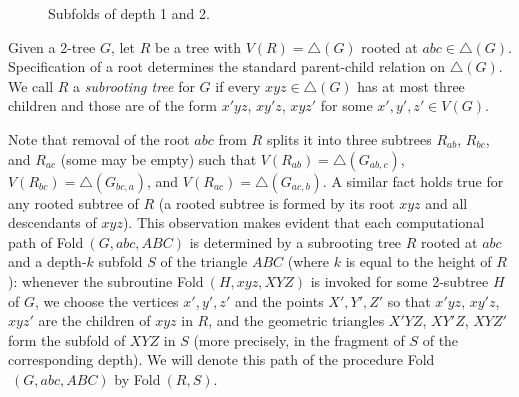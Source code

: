 \documentclass[reqno,12pt]{amsart}
\newcommand{\fold}[2]{{\sc Fold}$^{#1}\,(#2)$}
\begin{document}
\begin{figure}
\centering
\qquad\qquad
\caption{Subfolds of depth 1 and 2.}
\label{fig:subfolds}
\end{figure}

Given a 2-tree $G$, let $R$ be a tree with $V(R)=\triangle(G)$ rooted at $abc\in\triangle(G)$.
Specification of a root determines the standard parent-child relation on $\triangle(G)$.
We call $R$ a \emph{subrooting tree} for $G$ if every $xyz\in\triangle(G)$ has at most
three children and those are of the form $x'yz$, $xy'z$, $xyz'$ for some $x',y',z'\in V(G)$.

Note that removal of the root $abc$ from $R$ splits it into three subtrees
$R_{ab}$, $R_{bc}$, and $R_{ac}$ (some may be empty) such that $V(R_{ab})=\triangle(G_{ab,c})$, 
$V(R_{bc})=\triangle(G_{bc,a})$, and $V(R_{ac})=\triangle(G_{ac,b})$.
A similar fact holds true for any rooted subtree of $R$
(a rooted subtree is formed by its root $xyz$ and all descendants of $xyz$).
This observation makes evident that each computational path of \fold{}{G,abc,ABC}
is determined by a subrooting tree $R$ rooted at $abc$ and a depth-$k$ subfold $S$
of the triangle $ABC$ (where $k$ is equal to the height of $R$):
whenever the subroutine \fold{}{H,xyz,XYZ} is invoked for some 2-subtree $H$ of $G$,
we choose the vertices $x',y',z'$ and the points $X',Y',Z'$ so that
$x'yz$, $xy'z$, $xyz'$ are the children of $xyz$ in $R$, and
the geometric triangles $X'YZ$, $XY'Z$, $XYZ'$ form the subfold of $XYZ$ in $S$
(more precisely, in the fragment of $S$ of the corresponding depth).
We will denote this path of the procedure \fold{}{G,abc,ABC} by \fold{}{R,S}.
\end{document}
